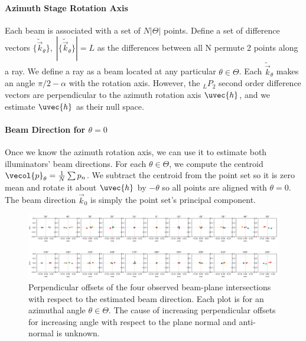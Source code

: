 \paragraph{Azimuth Stage Rotation Axis}
Each beam is associated with a set of $N|\Theta|$ points. Define a set of difference vectors $\{\tilde{\vec{k}}_\theta\}, \; |\{\tilde{\vec{k}}_\theta\}| = L$ as the differences between all N permute 2 points along a ray. We define a ray as a beam located at any particular $\theta \in \Theta$. Each $\tilde{\vec{k}}_\theta$ makes an angle $\pi/2 - \alpha$ with the rotation axis. However, the $_L P_2$ second order difference vectors are perpendicular to the azimuth rotation axis $\uvec{h}$, and we estimate $\uvec{h}$ as their null space.

\paragraph{Beam Direction for $\theta = 0$}
Once we know the azimuth rotation axis, we can use it to estimate both illuminators' beam directions. For each $\theta \in \Theta$, we compute the centroid $\vecol{p}_\theta = \frac{1}{N} \sum p_n$. We subtract the centroid from the point set so it is zero mean and rotate it about $\uvec{h}$ by $-\theta$ so all points are aligned with $\theta = 0$. The beam direction $\vec{k}_0$ is simply the point set's principal component.
%
\begin{figure}
    \centering
    \includegraphics[width=1\linewidth]{figures/beam_direction_fits.png}
    \caption{Perpendicular offsets of the four observed beam-plane intersections with respect to the estimated beam direction. Each plot is for an azimuthal angle $\theta \in \Theta$. The cause of increasing perpendicular offsets for increasing angle with respect to the plane normal and anti-normal is unknown.}
    \label{fig:beam_direction_plane_points}
\end{figure}

